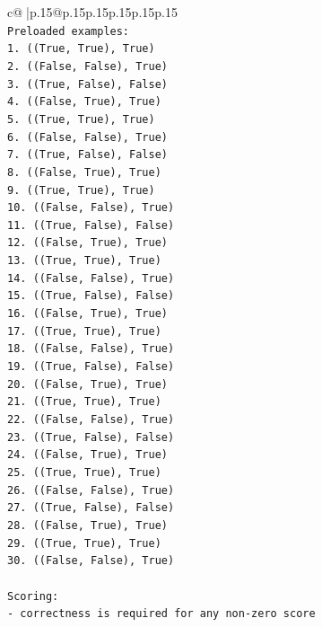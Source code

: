 \documentclass{article}
\begin{document}
{\begin{supertabular}{c@{$\;$}|p{.15\linewidth}@{}p{.15\linewidth}p{.15\linewidth}p{.15\linewidth}p{.15\linewidth}p{.15\linewidth}}
{{{\\ 
\texttt{Preloaded examples:} \\
\texttt{1. ((True, True), True)} \\
\texttt{2. ((False, False), True)} \\
\texttt{3. ((True, False), False)} \\
\texttt{4. ((False, True), True)} \\
\texttt{5. ((True, True), True)} \\
\texttt{6. ((False, False), True)} \\
\texttt{7. ((True, False), False)} \\
\texttt{8. ((False, True), True)} \\
\texttt{9. ((True, True), True)} \\
\texttt{10. ((False, False), True)} \\
\texttt{11. ((True, False), False)} \\
\texttt{12. ((False, True), True)} \\
\texttt{13. ((True, True), True)} \\
\texttt{14. ((False, False), True)} \\
\texttt{15. ((True, False), False)} \\
\texttt{16. ((False, True), True)} \\
\texttt{17. ((True, True), True)} \\
\texttt{18. ((False, False), True)} \\
\texttt{19. ((True, False), False)} \\
\texttt{20. ((False, True), True)} \\
\texttt{21. ((True, True), True)} \\
\texttt{22. ((False, False), True)} \\
\texttt{23. ((True, False), False)} \\
\texttt{24. ((False, True), True)} \\
\texttt{25. ((True, True), True)} \\
\texttt{26. ((False, False), True)} \\
\texttt{27. ((True, False), False)} \\
\texttt{28. ((False, True), True)} \\
\texttt{29. ((True, True), True)} \\
\texttt{30. ((False, False), True)} \\
\\ 
\texttt{Scoring:} \\
\texttt{{-} correctness is required for any non{-}zero score} \\
}}}
\end{supertabular}}
\end{document}
